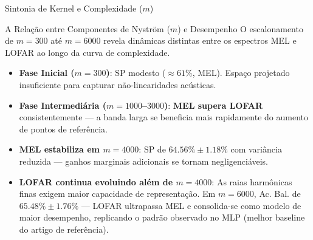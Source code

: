 \documentclass{beamer}
\begin{document}
\begin{frame}{Sintonia de Kernel e Complexidade ($m$)}
    \small
    \begin{block}{A Relação entre Componentes de Nyström ($m$) e Desempenho}
        O escalonamento de $m = 300$ até $m = 6000$ revela dinâmicas distintas entre os espectros MEL e LOFAR ao longo da curva de complexidade.
    \end{block}

    \vspace{0.1cm}
    \footnotesize
    \begin{itemize}
        \item \textbf{Fase Inicial ($m = 300$)}: SP modesto ($\approx 61\%$, MEL). Espaço projetado insuficiente para capturar não-linearidades acústicas.
        \item \textbf{Fase Intermediária ($m = 1000$--$3000$)}: \textbf{MEL supera LOFAR} consistentemente — a banda larga se beneficia mais rapidamente do aumento de pontos de referência.
        \item \textbf{MEL estabiliza em $m = 4000$}: SP de $64.56\% \pm 1.18\%$  com variância reduzida — ganhos marginais adicionais se tornam negligenciáveis.
        \item \textbf{LOFAR continua evoluindo além de $m = 4000$}: As raias harmônicas finas exigem maior capacidade de representação. Em $m = 6000$, Ac. Bal. de $65.48\% \pm 1.76\%$ — LOFAR ultrapassa MEL e consolida-se como modelo de maior desempenho, replicando o padrão observado no MLP (melhor baseline do artigo de referência).
    \end{itemize}
\end{frame}
\end{document}
